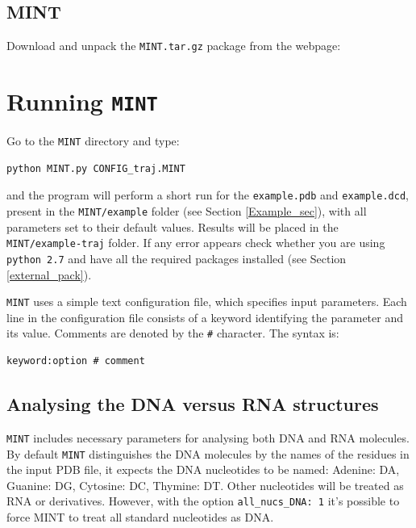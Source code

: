 \documentclass[12pt]{article}
\begin{document}
\subsection{MINT}
Download and unpack the {\tt MINT.tar.gz} package from the webpage:
\\


\section{Running {\tt MINT}}
Go to the {\tt MINT} directory and type:
\begin{verbatim}
python MINT.py CONFIG_traj.MINT
\end{verbatim}
and the program will perform a short run for the {\tt example.pdb} and {\tt example.dcd}, present in the {\tt MINT/example} folder (see Section \ref{Example_sec}), with all parameters set to their default values. Results will be placed in the {\tt MINT/example-traj} folder. If any error appears check whether you are using {\tt python 2.7} and have all the required packages installed (see Section \ref{external_pack}).

{\tt MINT} uses a simple text configuration file, which specifies input parameters. Each line in the configuration file consists of a keyword identifying the parameter and its value. Comments are denoted by the {\tt \#} character. The syntax is:
\begin{verbatim}
keyword:option # comment
\end{verbatim}


\subsection{Analysing the DNA versus RNA structures}
{\tt MINT} includes necessary parameters for analysing both DNA and RNA molecules. By default {\tt MINT} distinguishes the DNA molecules by the names of the residues in the input PDB file, it expects the DNA nucleotides to be named: Adenine: DA, Guanine: DG, Cytosine: DC, Thymine: DT. Other nucleotides will be treated as RNA or derivatives. 
However, with the option {\tt all\_nucs\_DNA: 1} it's possible to force MINT to treat all standard nucleotides as DNA. 
\end{document}
